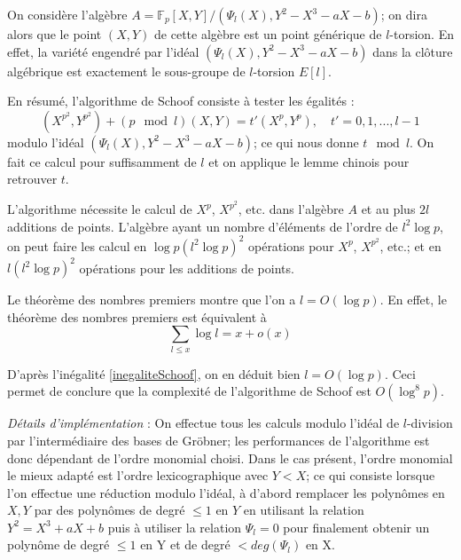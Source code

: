 \documentclass[a4paper]{article}
\theoremstyle{definition}
\theoremstyle{remark}
\numberwithin{equation}{section}
\begin{document}
On considère l'algèbre $A=\mathbb{F}_p[X,Y]/(\Psi_l(X),Y^2-X^3-aX-b)$; on dira alors que le point $(X,Y)$ de cette algèbre est un point générique de $l$-torsion. En effet, la variété engendré par l'idéal $(\Psi_l(X),Y^2-X^3-aX-b)$ dans la clôture algébrique est exactement le sous-groupe de $l$-torsion $E[l]$.

En résumé, l'algorithme de Schoof consiste à tester les égalités :
\begin{equation}
\label{polCarFrob}
(X^{p^2},Y^{p^2}) + (p \mod l)(X,Y) = t'(X^p,Y^p), \quad t' = 0,1,...,l-1
\end{equation}
modulo l'idéal $(\Psi_l(X),Y^2-X^3-aX-b)$; ce qui nous donne $t \mod l$. On fait ce calcul pour suffisamment de $l$ et on applique le lemme chinois pour retrouver $t$.

L'algorithme nécessite le calcul de $X^p$, $X^{p^2}$, etc. dans l'algèbre $A$ et au plus $2l$ additions de points. L'algèbre ayant un nombre d'éléments de l'ordre de $l^2\log p$, on peut faire les calcul en $\log p(l^2\log p)^2$ opérations pour $X^p$, $X^{p^2}$, etc.; et en $l(l^2\log p)^2$ opérations pour les additions de points.

Le théorème des nombres premiers montre que l'on a $l = O(\log p)$. En effet, le théorème des nombres premiers est équivalent à
$$\sum_{l \leq x}\log l = x + o(x)$$

D'après l'inégalité \ref{inegaliteSchoof}, on en déduit bien $l = O(\log p)$. Ceci permet de conclure que la complexité de l'algorithme de Schoof est $O(\log^8 p)$.

\emph{Détails d'implémentation} : On effectue tous les calculs modulo l'idéal de $l$-division par l'intermédiaire des bases de Gröbner; les performances de l'algorithme est donc dépendant de l'ordre monomial choisi. Dans le cas présent, l'ordre monomial le mieux adapté est l'ordre lexicographique avec $Y < X$; ce qui consiste lorsque l'on effectue une réduction modulo l'idéal, à d'abord remplacer les polynômes en $X,Y$ par des polynômes de degré $\leq 1$ en $Y$ en utilisant la relation $Y^2 = X^3 + aX + b$ puis à utiliser la relation $\Psi_l=0$ pour finalement obtenir un polynôme de degré $\leq 1$ en Y et de degré $< deg(\Psi_l)$ en X.
\end{document}
